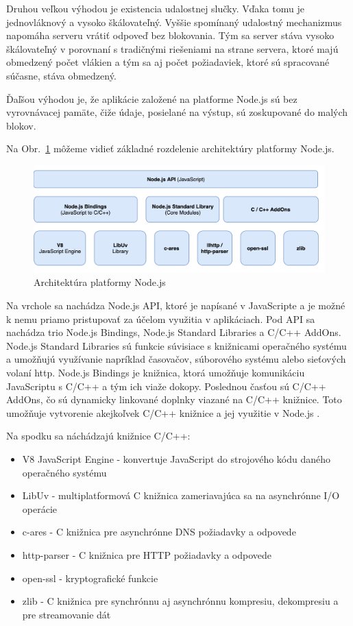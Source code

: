 \indent Druhou veľkou výhodou je existencia udalostnej slučky. Vďaka tomu je jednovláknový a vysoko škálovateľný. Vyššie spomínaný udalostný mechanizmus napomáha serveru vrátiť odpoveď bez blokovania. Tým sa server stáva vysoko škálovateľný v porovnaní s tradičnými riešeniami na strane servera, ktoré majú obmedzený počet vlákien a tým sa aj počet požiadaviek, ktoré sú spracované súčasne, stáva obmedzený. 

\indent Ďaľšou výhodou je, že aplikácie založené na platforme Node.js sú bez vyrovnávacej pamäte, čiže údaje, posielané na výstup, sú zoskupované do malých blokov.

\indent Na Obr.~\ref{fig:node_arch} môžeme vidieť základné rozdelenie architektúry platformy Node.js. 

\begin{figure}[H]
    \centering
    \includegraphics[scale=0.30]{img/node_architecture.png}
    \caption{Architektúra platformy Node.js \cite{nodejs_3}}
    \label{fig:node_arch}
\end{figure}

\indent Na vrchole sa nachádza Node.js API, ktoré je napísané v JavaScripte a je možné k nemu priamo pristupovať za účelom využitia v aplikáciach. Pod API sa nachádza trio Node.js Bindings, Node.js Standard Libraries a C/C++ AddOns. Node.js Standard Libraries sú funkcie súvisiace s knižnicami operačného systému a umožňujú využívanie napríklad časovačov, súborového systému alebo sieťových volaní http. Node.js Bindings je knižnica, ktorá umožňuje komunikáciu JavaScriptu s C/C++ a tým ich viaže dokopy. Poslednou časťou sú C/C++ AddOns, čo sú dynamicky linkované doplnky viazané na C/C++ knižnice. Toto umožňuje vytvorenie akejkoľvek C/C++ knižnice a jej využitie v Node.js \cite{nodejs_3,nodejs_4}. 

\indent Na spodku sa náchádzajú knižnice C/C++:
\begin{itemize}
    \item V8 JavaScript Engine - konvertuje JavaScript do strojového kódu daného operačného systému
    \item LibUv - multiplatformová C knižnica zameriavajúca sa na asynchrónne I/O operácie
    \item c-ares - C knižnica pre asynchrónne DNS požiadavky a odpovede
    \item http-parser - C knižnica pre HTTP požiadavky a odpovede
    \item open-ssl - kryptografické funkcie
    \item zlib - C knižnica pre synchrónnu aj asynchrónnu kompresiu, dekompresiu a pre streamovanie dát 
\end{itemize}

